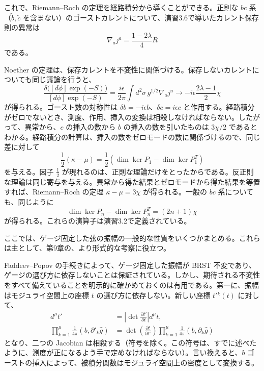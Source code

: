 
これで、Riemann--Roch の定理を経路積分から導くことができる。正則な $bc$ 系（$\tilde b,\tilde c$ を含まない）のゴーストカレントについて、演習3.6で導いたカレント保存則の異常は
\begin{equation}
\nabla_aj^a=\frac{1-2\lambda}{4}R
\tag{5.3.19}\label{eq:5.3.19}
\end{equation}
である。

Noether の定理は、保存カレントを不変性に関係づける。保存しないカレントについても同じ議論を行うと、
\begin{equation}
\frac{\delta\bigl([d\phi]\exp(-S)\bigr)}
{[d\phi]\exp(-S)}
=\frac{i\epsilon}{2\pi}\int d^2\sigma\,g^{1/2}\nabla_aj^a
\longrightarrow-i\epsilon\frac{2\lambda-1}{2}\chi
\tag{5.3.20}\label{eq:5.3.20}
\end{equation}
が得られる。ゴースト数の対称性は $\delta b=-i\epsilon b$、$\delta c=i\epsilon c$ と作用する。経路積分がゼロでないとき、測度、作用、挿入の変換は相殺しなければならない。したがって、異常から、$c$ の挿入の数から $b$ の挿入の数を引いたものは $3\chi/2$ であるとわかる。経路積分の計算は、挿入の数をゼロモードの数に関係づけるので、同じ差に対して
\begin{equation}
\frac12(\kappa-\mu)
=\frac12(\dim\ker P_1-\dim\ker P_1^T)
\tag{5.3.21}\label{eq:5.3.21}
\end{equation}
を与える。因子 $\tfrac12$ が現れるのは、正則な理論だけをとったからである。反正則な理論は同じ寄与を与える。異常から得た結果とゼロモードから得た結果を等置すれば、Riemann--Roch の定理 $\kappa-\mu=3\chi$ が得られる。一般の $bc$ 系についても、同じように
\begin{equation}
\dim\ker P_n-\dim\ker P_n^T=(2n+1)\chi
\tag{5.3.22}\label{eq:5.3.22}
\end{equation}
が得られる。これらの演算子は演習3.2で定義されている。


ここでは、ゲージ固定した弦の振幅の一般的な性質をいくつかまとめる。これらは主として、第9章の、より形式的な考察に役立つ。


Faddeev--Popov の手続きによって、ゲージ固定した振幅が BRST 不変であり、ゲージの選び方に依存しないことは保証されている。しかし、期待される不変性をすべて備えていることを明示的に確かめておくのは有用である。第一に、振幅はモジュライ空間上の座標 $t$ の選び方に依存しない。新しい座標 $t'{}^k(t)$ に対して、
\begin{equation}
\begin{aligned}
d^\mu t'&=\left|\det\frac{\partial t'}{\partial t}\right|d^\mu t,\\
\prod_{k=1}^{\mu}\frac{1}{4\pi}(b,\partial'_k\hat g)
&=\det\left(\frac{\partial t}{\partial t'}\right)
\prod_{k=1}^{\mu}\frac{1}{4\pi}(b,\partial_k\hat g)
\end{aligned}
\tag{5.4.1}\label{eq:5.4.1}
\end{equation}
となり、二つの Jacobian は相殺する（符号を除く。この符号は、すでに述べたように、測度が正になるよう手で定めなければならない）。言い換えると、$b$ ゴーストの挿入によって、被積分関数はモジュライ空間上の密度として変換する。

